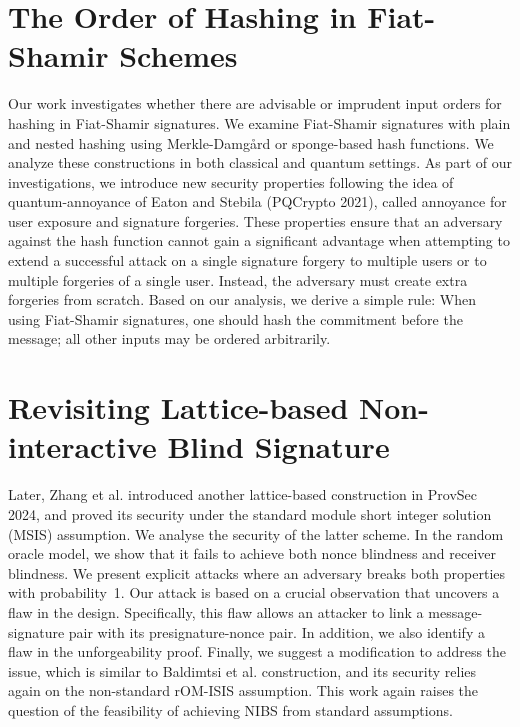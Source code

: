 \documentclass[11pt,oneside]{book}
\theoremstyle{definition}
\theoremstyle{remark}
\theoremstyle{plain}
\begin{document}
\section{\cite{cryptoeprint:2025/1846} The Order of Hashing in Fiat-Shamir Schemes}
Our work investigates whether there are advisable or imprudent input orders for hashing in Fiat-Shamir signatures. We examine Fiat-Shamir signatures with plain and nested hashing using Merkle-Damgård or sponge-based hash functions. We analyze these constructions in both classical and quantum settings. As part of our investigations, we introduce new security properties following the idea of quantum-annoyance of Eaton and Stebila (PQCrypto 2021), called annoyance for user exposure and signature forgeries. These properties ensure that an adversary against the hash function cannot gain a significant advantage when attempting to extend a successful attack on a single signature forgery to multiple users or to multiple forgeries of a single user. Instead, the adversary must create extra forgeries from scratch. Based on our analysis, we derive a simple rule: When using Fiat-Shamir signatures, one should hash the commitment before the message; all other inputs may be ordered arbitrarily.

\section{\cite{cryptoeprint:2025/1848} Revisiting Lattice-based Non-interactive Blind Signature}
Later, Zhang et al. introduced another lattice-based construction in ProvSec 2024, and proved its security under the standard module short integer solution (MSIS) assumption. We analyse the security of the latter scheme. In the random oracle model, we show that it fails to achieve both nonce blindness and receiver blindness. We present explicit attacks where an adversary breaks both properties with probability~1. Our attack is based on a crucial observation that uncovers a flaw in the design. Specifically, this flaw allows an attacker to link a message-signature pair with its presignature-nonce pair. In addition, we also identify a flaw in the unforgeability proof. Finally, we suggest a modification to address the issue, which is similar to Baldimtsi et al. construction, and its security relies again on the non-standard rOM-ISIS assumption. This work again raises the question of the feasibility of achieving NIBS from standard assumptions.

%
%
\printbibliography
\end{document}
